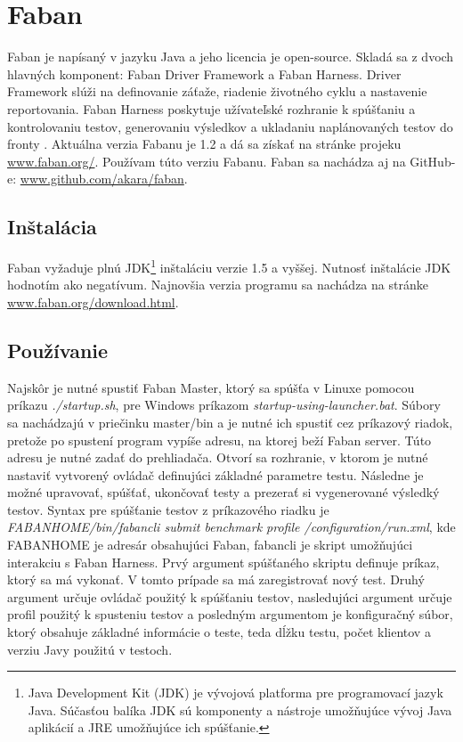 \documentclass[12pt,oneside,final]{fithesis-utf8}
\newcommand\underscore[1]{\underline{\hspace{8pt}}}
\begin{document}
\newpage
\section{Faban}
Faban je napísaný v jazyku Java a jeho licencia je open-source. Skladá sa z dvoch hlavných komponent: Faban Driver Framework a Faban Harness. Driver Framework slúži na definovanie záťaže, riadenie životného cyklu a nastavenie reportovania. Faban Harness poskytuje užívateľské rozhranie k spúšťaniu a kontrolovaniu testov, generovaniu výsledkov a ukladaniu naplánovaných testov do fronty \cite{Faban}. Aktuálna verzia  Fabanu je 1.2 a dá sa získať na stránke projeku \url{www.faban.org/}. Používam túto verziu Fabanu. Faban sa nachádza aj na GitHub-e: \url{www.github.com/akara/faban}.

\subsection{Inštalácia}
Faban vyžaduje plnú JDK\footnote{Java Development Kit (JDK) je vývojová platforma pre programovací jazyk Java. Súčasťou balíka JDK sú komponenty a nástroje umožňujúce vývoj Java aplikácií a JRE umožňujúce ich spúšťanie.} inštaláciu verzie 1.5 a vyššej. Nutnosť inštalácie JDK hodnotím ako negatívum. Najnovšia verzia programu sa nachádza na stránke \url{www.faban.org/download.html}.

\subsection{Používanie}
Najskôr je nutné spustiť Faban Master, ktorý sa spúšťa v Linuxe pomocou príkazu \textit{./startup.sh}, pre Windows príkazom \textit{startup-using-launcher.bat}. Súbory sa nachádzajú v priečinku master/bin a je nutné ich spustiť cez príkazový riadok, pretože po spustení program vypíše adresu, na ktorej beží Faban server. Túto adresu je nutné zadať do prehliadača. Otvorí sa rozhranie, v ktorom je nutné nastaviť vytvorený ovládač definujúci základné parametre testu. Následne je možné upravovať, spúšťať, ukončovať testy a prezerať si vygenerované výsledký testov. Syntax pre spúšťanie testov z príkazového riadku je \textit{FABAN\underscore{}HOME/bin/fabancli submit benchmark profile /configuration/run.xml}, kde FABAN\underscore{}HOME je adresár obsahujúci Faban, fabancli je skript umožňujúci interakciu s Faban Harness. Prvý argument spúšťaného skriptu definuje príkaz, ktorý sa má vykonať. V tomto prípade sa má zaregistrovať nový test. Druhý argument určuje ovládač použitý k spúšťaniu testov, nasledujúci argument určuje profil použitý k spusteniu testov a posledným argumentom je konfiguračný súbor, ktorý obsahuje základné informácie o teste, teda dĺžku testu, počet klientov a verziu Javy použitú v testoch.
\end{document}
